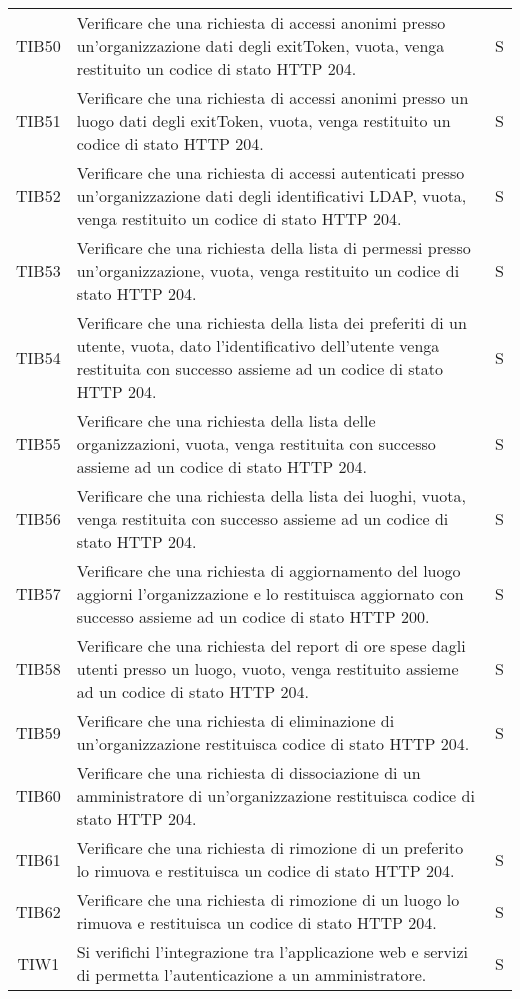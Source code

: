 {\begin{longtable}{ c C{13cm} C{1cm}}
TIB50 & Verificare che una richiesta di accessi anonimi presso un'organizzazione dati degli exitToken, vuota, venga restituito un codice di stato HTTP 204. & S \\
TIB51 & Verificare che una richiesta di accessi anonimi presso un luogo dati degli exitToken, vuota, venga restituito un codice di stato HTTP 204. & S \\
TIB52 & Verificare che una richiesta di accessi autenticati presso un'organizzazione dati degli identificativi LDAP, vuota, venga restituito un codice di stato HTTP 204. & S \\
TIB53 & Verificare che una richiesta della lista di permessi presso un'organizzazione, vuota, venga restituito un codice di stato HTTP 204. & S \\
TIB54 & Verificare che una richiesta della lista dei preferiti di un utente, vuota, dato l'identificativo dell'utente venga restituita con successo assieme ad un codice di stato HTTP 204. & S \\
TIB55 & Verificare che una richiesta della lista delle organizzazioni, vuota, venga restituita con successo assieme ad un codice di stato HTTP 204. & S \\
TIB56 & Verificare che una richiesta della lista dei luoghi, vuota, venga restituita con successo assieme ad un codice di stato HTTP 204. & S \\
TIB57 & Verificare che una richiesta di aggiornamento del luogo aggiorni l'organizzazione e lo restituisca aggiornato con successo assieme ad un codice di stato HTTP 200. & S \\
TIB58 & Verificare che una richiesta del report di ore spese dagli utenti presso un luogo, vuoto, venga restituito assieme ad un codice di stato HTTP 204. & S \\
TIB59 & Verificare che una richiesta di eliminazione di un'organizzazione restituisca codice di stato HTTP 204. & S \\
TIB60 & Verificare che una richiesta di dissociazione di un amministratore di un'organizzazione restituisca codice di stato HTTP 204. \\
TIB61 & Verificare che una richiesta di rimozione di un preferito lo rimuova e restituisca un codice di stato HTTP 204. & S \\
TIB62 & Verificare che una richiesta di rimozione di un luogo lo rimuova e restituisca un codice di stato HTTP 204. & S \\
TIW1 & Si verifichi l’integrazione tra l’applicazione web e servizi di  permetta l’autenticazione a un amministratore. & S \\

\end{longtable}}
